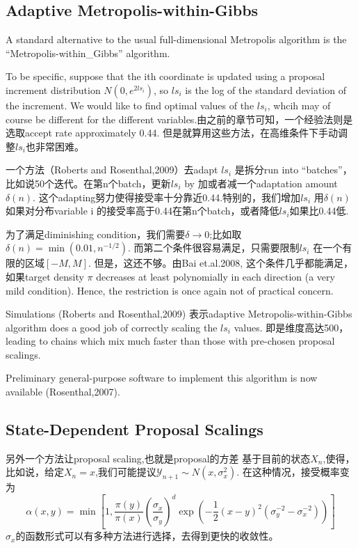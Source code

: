 \documentclass[
]{book}
\theoremstyle{definition}
\theoremstyle{definition}
\theoremstyle{definition}
\theoremstyle{remark}
\begin{document}
\hypertarget{adaptive-metropolis-within-gibbs}{%
\subsection{Adaptive Metropolis-within-Gibbs}\label{adaptive-metropolis-within-gibbs}}

A standard alternative to the usual full-dimensional Metropolis algorithm is the ``Metropolis-within\_Gibbs'' algorithm.

To be specific, suppose that the ith coordinate is updated using a proposal increment distribution \(N(0,e^{2 ls_i})\), so \(ls_i\) is the log of the standard deviation of the increment. We would like to find optimal values of the \(ls_i\), whcih may of course be different for the different variables.由之前的章节可知，一个经验法则是选取accept rate approximately 0.44.
但是就算用这些方法，在高维条件下手动调整\(ls_i\)也非常困难。

一个方法（Roberts and Rosenthal,2009）去adapt \(ls_i\) 是拆分run into ``batches''，比如说50个迭代。在第n个batch，更新\(ls_i\) by 加或者减一个adaptation amount \(\delta(n)\). 这个adapting努力使得接受率十分靠近0.44.特别的，我们增加\(ls_i\) 用\(\delta(n)\) 如果对分布variable i 的接受率高于0.44在第n个batch，或者降低\(ls_i\)如果比0.44低.

为了满足diminishing condition，我们需要\(\delta\rightarrow 0\);比如取\(\delta(n)=\min \left(0.01, n^{-1 / 2}\right)\). 而第二个条件很容易满足，只需要限制\(ls_i\) 在一个有限的区域\([-M,M]\). 但是，这还不够。由Bai et.al.2008, 这个条件几乎都能满足，如果target density \(\pi\) decreases at least polynomially in each direction (a very mild condition). Hence, the restriction is once again not of practical concern.

Simulations (Roberts and Rosenthal,2009) 表示adaptive Metropolis-within-Gibbs algorithm does a good job of correctly scaling the \(ls_i\) values. 即是维度高达500，leading to chains which mix much faster than those with pre-chosen proposal scalings.

Preliminary general-purpose software to implement this algorithm is now available (Rosenthal,2007).

\hypertarget{state-dependent-proposal-scalings}{%
\subsection{State-Dependent Proposal Scalings}\label{state-dependent-proposal-scalings}}

另外一个方法让proposal scaling,也就是proposal的方差 基于目前的状态\(X_n\),使得，比如说，给定\(X_n=x\),我们可能提议\(\mathcal Y_{n+1}\sim N(x,\sigma^2_x)\). 在这种情况，接受概率变为
\[
\alpha(x, y)=\min \left[1, \frac{\pi(y)}{\pi(x)}\left(\frac{\sigma_{x}}{\sigma_{y}}\right)^{d} \exp \left(-\frac{1}{2}(x-y)^{2}\left(\sigma_{y}^{-2}-\sigma_{x}^{-2}\right)\right)\right]
\]
\(\sigma_x\)的函数形式可以有多种方法进行选择，去得到更快的收敛性。
\end{document}
